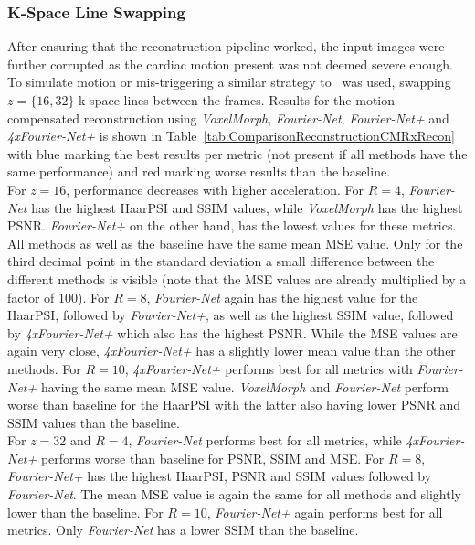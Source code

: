 \subsubsection{K-Space Line Swapping}
After ensuring that the reconstruction pipeline worked, the input images were further corrupted as the cardiac motion present was not deemed severe enough. To simulate motion or mis-triggering a similar strategy to~\cite{Oksuz2020} was used, swapping $z=\{16,32\}$ k-space lines between the frames. Results for the motion-compensated reconstruction using \emph{VoxelMorph}, \emph{Fourier-Net}, \emph{Fourier-Net+} and \emph{4xFourier-Net+} is shown in Table~\ref{tab:ComparisonReconstructionCMRxRecon} with blue marking the best results per metric (not present if all methods have the same performance) and red marking worse results than the baseline.\\
For $z=16$, performance decreases with higher acceleration. For $R=4$, \emph{Fourier-Net} has the highest HaarPSI and SSIM values, while \emph{VoxelMorph} has the highest PSNR. \emph{Fourier-Net+} on the other hand, has the lowest values for these metrics. All methods as well as the baseline have the same mean MSE value. Only for the third decimal point in the standard deviation a small difference between the different methods is visible (note that the MSE values are already multiplied by a factor of 100).%
For $R=8$, \emph{Fourier-Net} again has the highest value for the HaarPSI, followed by \emph{Fourier-Net+}, as well as the highest SSIM value, followed by \emph{4xFourier-Net+} which also has the highest PSNR. While the MSE values are again very close, \emph{4xFourier-Net+} has a slightly lower mean value than the other methods.%
For $R=10$, \emph{4xFourier-Net+} performs best for all metrics with \emph{Fourier-Net+} having the same mean MSE value. \emph{VoxelMorph} and \emph{Fourier-Net} perform worse than baseline for the HaarPSI with the latter also having lower PSNR and SSIM values than the baseline.\\
For $z=32$ and $R=4$, \emph{Fourier-Net} performs best for all metrics, while \emph{4xFourier-Net+} performs worse than baseline for PSNR, SSIM and MSE. For $R=8$, \emph{Fourier-Net+} has the highest HaarPSI, PSNR and SSIM values followed by \emph{Fourier-Net}. The mean MSE value is again the same for all methods and slightly lower than the baseline. For $R=10$, \emph{Fourier-Net+} again performs best for all metrics. Only \emph{Fourier-Net} has a lower SSIM than the baseline.

